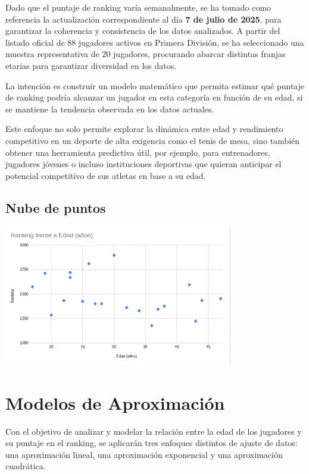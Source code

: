 \documentclass[12pt]{article}
\begin{document}
    Dado que el puntaje de ranking varía semanalmente, se ha tomado como referencia la actualización correspondiente al día \textbf{7 de julio de 2025}, para garantizar la coherencia y consistencia de los datos analizados. A partir del listado oficial de 88 jugadores activos en Primera División, se ha seleccionado una muestra representativa de 20 jugadores, procurando abarcar distintas franjas etarias para garantizar diversidad en los datos.

    La intención es construir un modelo matemático que permita estimar qué puntaje de ranking podría alcanzar un jugador en esta categoría en función de su edad, si se mantiene la tendencia observada en los datos actuales.

    Este enfoque no solo permite explorar la dinámica entre edad y rendimiento competitivo en un deporte de alta exigencia como el tenis de mesa, sino también obtener una herramienta predictiva útil, por ejemplo, para entrenadores, jugadores jóvenes o incluso instituciones deportivas que quieran anticipar el potencial competitivo de sus atletas en base a su edad.


    \vspace{1cm}

    \subsection*{Nube de puntos}

    \begin{center}
        \includegraphics[width=0.75\textwidth]{nube.png}    
    \end{center}


\newpage
\section*{Modelos de Aproximación}

    Con el objetivo de analizar y modelar la relación entre la edad de los jugadores y su puntaje en el ranking, se aplicarán tres enfoques distintos de ajuste de datos: una aproximación lineal, una aproximación exponencial y una aproximación cuadrática.
\end{document}
